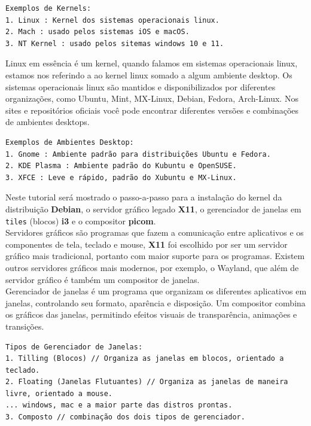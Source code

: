 \documentclass[12pt,a4paper]{article}
\begin{document}
\begin{lstlisting}
Exemplos de Kernels:
1. Linux : Kernel dos sistemas operacionais linux. 
2. Mach : usado pelos sistemas iOS e macOS.
3. NT Kernel : usado pelos sitemas windows 10 e 11.
\end{lstlisting}

\vspace{\baselineskip}

Linux em essência é um kernel, quando falamos em sistemas operacionais linux, estamos nos referindo a ao kernel linux somado a algum ambiente desktop. Os sistemas operacionais linux são mantidos e disponibilizados por diferentes organizações, como Ubuntu, Mint, MX-Linux, Debian, Fedora, Arch-Linux. Nos sites e repositórios oficiais você pode encontrar diferentes versões e combinações de ambientes desktops. \\ 


\begin{lstlisting}
Exemplos de Ambientes Desktop:
1. Gnome : Ambiente padrão para distribuições Ubuntu e Fedora.
2. KDE Plasma : Ambiente padrão do Kubuntu e OpenSUSE. 
3. XFCE : Leve e rápido, padrão do Xubuntu e MX-Linux.
\end{lstlisting}

\vspace{\baselineskip}

Neste tutorial será mostrado o passo-a-passo para a instalação do kernel da distribuição \textbf{Debian}, o servidor gráfico legado \textbf{X11}, o gerenciador de janelas em \texttt{tiles} (blocos) \textbf{i3} e o compositor \textbf{picom}.\\

Servidores gráficos são programas que fazem a comunicação entre aplicativos e os componentes de tela, teclado e mouse, \textbf{X11} foi escolhido por ser um servidor gráfico mais tradicional, portanto com maior suporte para os programas. Existem outros servidores gráficos mais modernos, por exemplo, o Wayland, que além de servidor gráfico é também um compositor de janelas. \\

Gerenciador de janelas é um programa que organizam os diferentes aplicativos em janelas, controlando seu formato, aparência e disposição. Um compositor combina os gráficos das janelas, permitindo efeitos visuais de transparência, animações e transições. \\

\begin{lstlisting}
Tipos de Gerenciador de Janelas:
1. Tilling (Blocos) // Organiza as janelas em blocos, orientado a teclado.
2. Floating (Janelas Flutuantes) // Organiza as janelas de maneira livre, orientado a mouse. 
... windows, mac e a maior parte das distros prontas.
3. Composto // combinação dos dois tipos de gerenciador.
\end{lstlisting}
\end{document}
